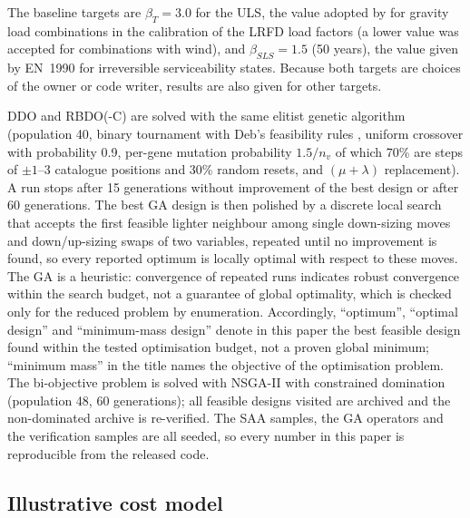 The baseline targets are $\beta_T = 3.0$ for the ULS, the value adopted by \citet{Ellingwood1980}
for gravity load combinations in the calibration of the LRFD load factors (a lower value was
accepted for combinations with wind), and $\beta_{SLS}=1.5$ (50 years), the value given by EN~1990
\citep{EN1990} for irreversible serviceability states. Because both targets are choices of the
owner or code writer, results are also given for other targets.

DDO and RBDO(-C) are solved with the same elitist genetic algorithm (population 40, binary
tournament with Deb's feasibility rules \citep{Deb2000}, uniform crossover with probability 0.9,
per-gene mutation probability $1.5/n_v$ of which 70\% are steps of $\pm1$--3 catalogue positions
and 30\% random resets, and $(\mu+\lambda)$ replacement). A run stops after 15 generations without
improvement of the best design or after 60 generations. The best GA design is then polished by a
discrete local search that accepts the first feasible lighter neighbour among single down-sizing
moves and down/up-sizing swaps of two variables, repeated until no improvement is found, so every
reported optimum is locally optimal with respect to these moves. The GA is a heuristic: convergence
of repeated runs indicates robust convergence within the search budget, not a guarantee of global
optimality, which is checked only for the reduced problem by enumeration. Accordingly, ``optimum'',
``optimal design'' and ``minimum-mass design'' denote in this paper the best feasible design found
within the tested optimisation budget, not a proven global minimum; ``minimum mass'' in the title
names the objective of the optimisation problem. The bi-objective
problem is solved with NSGA-II \citep{Deb2002} with constrained domination (population 48, 60
generations); all feasible designs visited are archived and the non-dominated archive is
re-verified. The SAA samples, the GA operators and the verification samples are all seeded, so
every number in this paper is reproducible from the released code.

\subsection{Illustrative cost model}\label{sec:costmodel}

